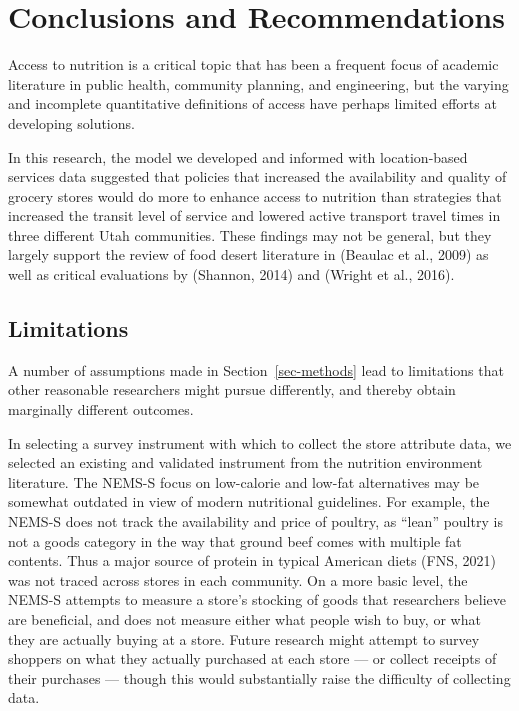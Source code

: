\documentclass[
  letterpaper,
  number,
  review,
  3p]{elsarticle}
\begin{document}

\section{Conclusions and Recommendations}\label{sec-conclude}

Access to nutrition is a critical topic that has been a frequent focus
of academic literature in public health, community planning, and
engineering, but the varying and incomplete quantitative definitions of
access have perhaps limited efforts at developing solutions.

In this research, the model we developed and informed with
location-based services data suggested that policies that increased the
availability and quality of grocery stores would do more to enhance
access to nutrition than strategies that increased the transit level of
service and lowered active transport travel times in three different
Utah communities. These findings may not be general, but they largely
support the review of food desert literature in (Beaulac et al., 2009)
as well as critical evaluations by (Shannon, 2014) and (Wright et al.,
2016).

\subsection{Limitations}\label{sec-limitations}

A number of assumptions made in Section~\ref{sec-methods} lead to
limitations that other reasonable researchers might pursue differently,
and thereby obtain marginally different outcomes.

In selecting a survey instrument with which to collect the store
attribute data, we selected an existing and validated instrument from
the nutrition environment literature. The NEMS-S focus on low-calorie
and low-fat alternatives may be somewhat outdated in view of modern
nutritional guidelines. For example, the NEMS-S does not track the
availability and price of poultry, as ``lean'' poultry is not a goods
category in the way that ground beef comes with multiple fat contents.
Thus a major source of protein in typical American diets (FNS, 2021) was
not traced across stores in each community. On a more basic level, the
NEMS-S attempts to measure a store's stocking of goods that researchers
believe are beneficial, and does not measure either what people wish to
buy, or what they are actually buying at a store. Future research might
attempt to survey shoppers on what they actually purchased at each store
--- or collect receipts of their purchases --- though this would
substantially raise the difficulty of collecting data.
\end{document}
